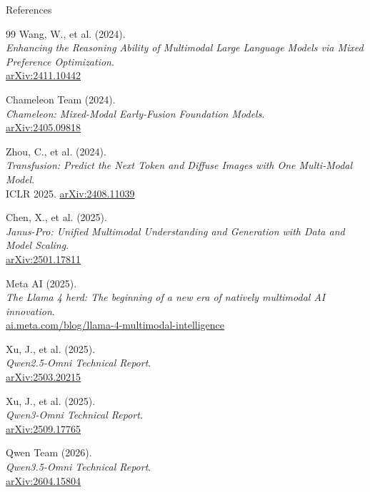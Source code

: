 \begin{frame}[allowframebreaks]{References}
\begin{thebibliography}{99}
      Wang, W., et al. (2024). \\
      \emph{Enhancing the Reasoning Ability of Multimodal Large Language Models via Mixed Preference Optimization}.\\
      \href{https://arxiv.org/abs/2411.10442}{arXiv:2411.10442}

      Chameleon Team (2024). \\
      \emph{Chameleon: Mixed-Modal Early-Fusion Foundation Models}.\\
      \href{https://arxiv.org/abs/2405.09818}{arXiv:2405.09818}

      Zhou, C., et al. (2024). \\
      \emph{Transfusion: Predict the Next Token and Diffuse Images with One Multi-Modal Model}.\\
      ICLR 2025. \href{https://arxiv.org/abs/2408.11039}{arXiv:2408.11039}

      Chen, X., et al. (2025). \\
      \emph{Janus-Pro: Unified Multimodal Understanding and Generation with Data and Model Scaling}.\\
      \href{https://arxiv.org/abs/2501.17811}{arXiv:2501.17811}

      Meta AI (2025). \\
      \emph{The Llama 4 herd: The beginning of a new era of natively multimodal AI innovation}.\\
      \href{https://ai.meta.com/blog/llama-4-multimodal-intelligence/}{ai.meta.com/blog/llama-4-multimodal-intelligence}

      Xu, J., et al. (2025). \\
      \emph{Qwen2.5-Omni Technical Report}.\\
      \href{https://arxiv.org/abs/2503.20215}{arXiv:2503.20215}

      Xu, J., et al. (2025). \\
      \emph{Qwen3-Omni Technical Report}.\\
      \href{https://arxiv.org/abs/2509.17765}{arXiv:2509.17765}

      Qwen Team (2026). \\
      \emph{Qwen3.5-Omni Technical Report}.\\
      \href{https://arxiv.org/abs/2604.15804}{arXiv:2604.15804}


\end{thebibliography}
\end{frame}
